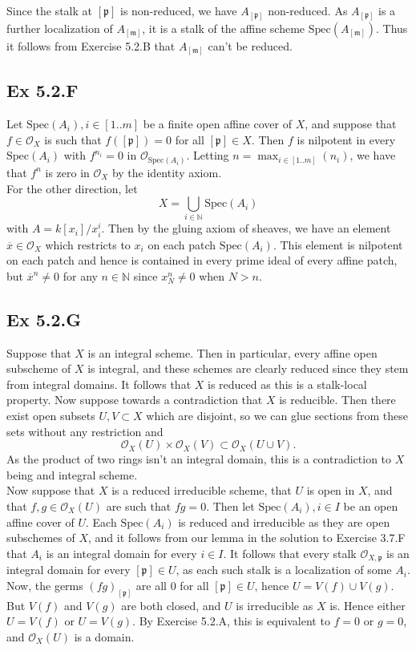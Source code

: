 \documentclass{article}
\theoremstyle{definition}
\newcommand{\N}{\mathbb{N}}
\newcommand{\oo}{\mathcal{O}}
\newcommand{\osp}[1]{\oo_{\Spec\left(#1\right)}}
\newcommand{\Spec}{\text{Spec}}
\begin{document}
Since the stalk at $[\mathfrak{p}]$ is non-reduced, we have
$A_{[\mathfrak{p}]}$ non-reduced. As $A_{[\mathfrak{p}]}$ is a further
localization of $A_{[\mathfrak{m}]}$, it is a stalk of the affine scheme
$\Spec(A_{[\mathfrak{m}]})$. Thus it follows from Exercise 5.2.B that
$A_{[\mathfrak{m}]}$ can't be reduced.

\subsection*{Ex 5.2.F}

Let $\Spec(A_i), i \in [1..m]$ be a finite open affine cover of $X$, and
suppose that $f \in \oo_{X}$ is such that $f([\mathfrak{p}]) = 0$ for all
$[\mathfrak{p}] \in X$. Then $f$ is nilpotent in every $\Spec(A_i)$ with
$f^{n_i} = 0$ in $\osp{A_i}$. Letting $n = \max_{i \in [1..m]}(n_i)$, we have
that $f^n$ is zero in $\oo_{X}$ by the identity axiom. \\

For the other direction, let
\[
	X
	=
	\bigcup_{i \in \N} \Spec(A_i)
\]
with $A = k[x_i]/x_i^i$. Then by the gluing axiom of sheaves, we have an
element $\overline{x} \in \oo_{X}$ which restricts to $x_i$ on each patch
$\Spec(A_i)$. This element is nilpotent on each patch and hence is contained in
every prime ideal of every affine patch, but $\overline{x}^n \not = 0$ for any
$n \in \N$ since $x_N^{n} \not = 0$ when $N > n$.

\subsection*{Ex 5.2.G}

Suppose that $X$ is an integral scheme. Then in particular, every affine open
subscheme of $X$ is integral, and these schemes are clearly reduced since they
stem from integral domains. It follows that $X$ is reduced as this is a
stalk-local property. Now suppose towards a contradiction that $X$ is
reducible. Then there exist open subsets $U, V \subset X$ which are disjoint,
so we can glue sections from these sets without any restriction and
\[
	\oo_{X}(U)
	\times
	\oo_{X}(V)
	\subset
	\oo_{X}(U \cup V).
\]
As the product of two rings isn't an integral domain, this is a contradiction
to $X$ being and integral scheme. \\

Now suppose that $X$ is a reduced irreducible scheme, that $U$ is open in $X$,
and that $f, g \in \mathcal{O}_X(U)$ are such that $fg = 0$. Then let
$\Spec(A_i), i \in I$ be an open affine cover of $U$. Each $\Spec(A_i)$ is
reduced and irreducible as they are open subschemes of $X$, and it follows from
our lemma in the solution to Exercise 3.7.F that $A_i$ is an integral domain
for every $i \in I$. It follows that every stalk $\mathcal{O}_{X,
\mathfrak{p}}$ is an integral domain for every $[\mathfrak{p}] \in U$, as each
such stalk is a localization of some $A_i$. Now, the germs
$(fg)_{[\mathfrak{p}]}$ are all $0$ for all $[\mathfrak{p}] \in U$, hence $U =
V(f) \cup V(g)$. But $V(f)$ and $V(g)$ are both closed, and $U$ is irreducible
as $X$ is. Hence either $U = V(f)$ or $U = V(g)$. By Exercise 5.2.A, this is
equivalent to $f = 0$ or $g = 0$, and $\mathcal{O}_X(U)$ is a domain. 
\end{document}
